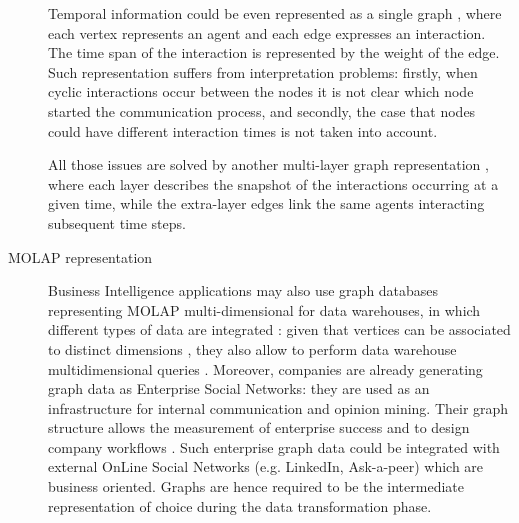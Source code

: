 \begin{description}
	Temporal information could be even represented as a single graph \cite{Wu}, where
	each vertex represents an agent and each edge expresses an interaction. The time span of the interaction is
	represented by the weight of the edge. Such representation suffers from interpretation problems: firstly, when cyclic
	interactions occur between the nodes it is not clear which node started the communication process, and secondly,
	the case that nodes could have different interaction times is not taken into account.
	
	All those issues are
	solved by another multi-layer graph representation \cite{Kostakos2008}, where each layer describes the snapshot
	of the interactions occurring at a given time, while the extra-layer edges link the same agents interacting
	subsequent time steps.
\item[MOLAP representation] \label{molap} %
Business Intelligence applications may also use %
graph databases representing %
MOLAP multi-dimensional for data warehouses, in which different types of data are %
integrated \cite{Petermann2014,SoussiAZ11}: given that vertices can be associated to distinct dimensions \cite{PterMicBergami}, they also allow to perform 
data warehouse multidimensional queries  \cite{ChenYZHY08,Zhao11,Etcheverry2012a}. Moreover, companies are already
generating graph data as Enterprise Social Networks: they are used as an infrastructure for internal communication and
opinion mining. Their graph structure allows the measurement of enterprise
success \cite{success} and to design company workflows \cite{Park2016355}. 
Such enterprise graph data could be integrated with  external OnLine Social Networks (e.g. LinkedIn, Ask-a-peer) which are business oriented. Graphs are hence required to be the intermediate 
representation of choice during the data transformation phase. 

\end{description}
